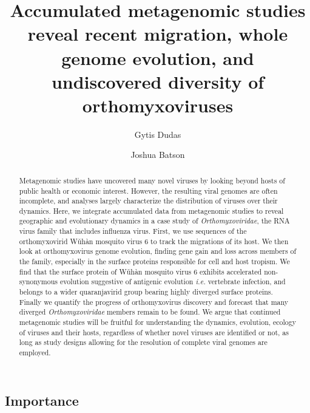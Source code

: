 \documentclass[11pt]{article}
\begin{document}
\linenumbers

\title{Accumulated metagenomic studies reveal recent migration, whole genome evolution, and undiscovered diversity of orthomyxoviruses}

\author[a,1]{Gytis Dudas}
\author[b,1]{Joshua Batson}



\maketitle


  \begin{abstract}

  Metagenomic studies have uncovered many novel viruses by looking beyond hosts of public health or economic interest.
  However, the resulting viral genomes are often incomplete, and analyses largely characterize the distribution of viruses over their dynamics.
  Here, we integrate accumulated data from metagenomic studies to reveal geographic and evolutionary dynamics in a case study of \textit{Orthomyxoviridae}, the RNA virus family that includes influenza virus.
  First, we use sequences of the orthomyxovirid W\v{u}h\`{a}n mosquito virus 6 to track the migrations of its host.
  We then look at orthomyxovirus genome evolution, finding gene gain and loss across members of the family, especially in the surface proteins responsible for cell and host tropism.
  We find that the surface protein of W\v{u}h\`{a}n mosquito virus 6 exhibits accelerated non-synonymous evolution suggestive of antigenic evolution \textit{i.e.} vertebrate infection, and belongs to a wider quaranjavirid group bearing highly diverged surface proteins.
  Finally we quantify the progress of orthomyxovirus discovery and forecast that many diverged \textit{Orthomyxoviridae} members remain to be found.
  We argue that continued metagenomic studies will be fruitful for understanding the dynamics, evolution, ecology of viruses and their hosts, regardless of whether novel viruses are identified or not, as long as study designs allowing for the resolution of complete viral genomes are employed.
  \end{abstract}

\subsection{Importance}
\end{document}
